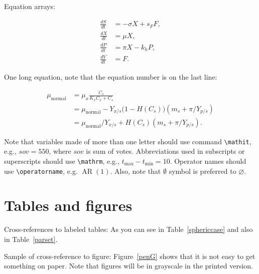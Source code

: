 \documentclass[qe,nameyear,final]{econsocart}
\begin{document}
Equation arrays:

\begin{align}
  \frac{dS}{dt} & = - \sigma X + s_{F} F,\\
  \frac{dX}{dt} & =   \mu    X,\\
  \frac{dP}{dt} & =   \pi    X - k_{h} P,\\
  \frac{dV}{dt} & =   F.
\end{align}

One long equation, note that the equation number is on the last line:

\begin{align}
 \mu_{\text{normal}} & = \mu_{x} \frac{C_{s}}{K_{x}C_{x}+C_{s}}  \nonumber\\
                     & = \mu_{\text{normal}} - Y_{x/s}\bigl(1-H(C_{s})\bigr)(m_{s}+\pi /Y_{p/s})\nonumber\\
                     & = \mu_{\text{normal}}/Y_{x/s}+ H(C_{s}) (m_{s}+ \pi /Y_{p/s}).

\end{align}

Note that variables made of more than one letter should use command \texttt{{\textbackslash}mathit},
e.g., $\mathit{sov}=550$, where $\mathit{sov}$ is sum of votes. Abbreviations used in subscripts or superscripts should use \texttt{{\textbackslash}mathrm},
e.g., $t_{\mathrm{max}} -t_{\mathrm{min}} =10$. Operator names should use \texttt{{\textbackslash}operatorname}, e.g. $\operatorname{AR}(1)$. Also, note that $\emptyset$ symbol is preferred to $\varnothing$.

\section{Tables and figures}

Cross-references to labeled tables: As you can see in Table~\ref{sphericcase}
and also in Table~\ref{parset}.

Sample of cross-reference to figure: Figure~\ref{penG} shows that it is not easy to get something on paper. Note that figures will be in grayscale in the printed version.
\end{document}
